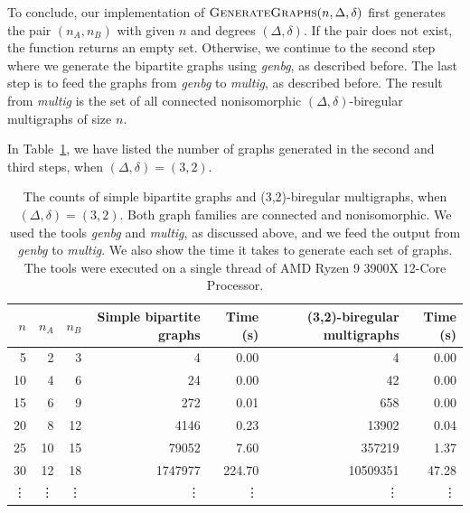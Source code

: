 To conclude, our implementation of $\textsc{GenerateGraphs}(n, \Delta, \delta)$ first generates the pair $(n_A, n_B)$ with given $n$ and degrees $(\Delta, \delta)$.
If the pair does not exist, the function returns an empty set.
Otherwise, we continue to the second step where we generate the bipartite graphs using \emph{genbg}, as described before.
The last step is to feed the graphs from \emph{genbg} to \emph{multig}, as described before.
The result from \emph{multig} is the set of all connected nonisomorphic $(\Delta, \delta)$-biregular multigraphs of size $n$.

In Table~\ref{tbl:graph_count_nonisomorphicasdasd}, we have listed the number of graphs generated in the second and third steps, when $(\Delta, \delta)=(3,2)$.


\begin{table}[H]
  \centering
  \begin{adjustbox}{width={\textwidth},keepaspectratio}%
  \begin{tabular}{r|rr|rr|rr}
    \toprule
    $n$& $n_A$ & $n_B$ & Simple bipartite graphs & Time (s) & (3,2)-biregular multigraphs  & Time (s)\\
    \midrule
    5   & 2 & 3   & 4  & 0.00    & 4     & 0.00\\
    10  & 4 & 6   & 24  & 0.00   & 42    & 0.00\\
    15  & 6 & 9   & 272  & 0.01  & 658   & 0.00\\
    20  & 8 & 12  & 4146 & 0.23  & 13902 & 0.04\\
    25  & 10 & 15 & 79052 & 7.60 & 357219& 1.37\\
    30  & 12 & 18 & 1747977 & 224.70 & 10509351& 47.28\\
    \vdots & \vdots &\vdots&\vdots&\vdots&\vdots&\vdots\\
    \bottomrule
  \end{tabular}
  \end{adjustbox}
  \caption{%
    The counts of simple bipartite graphs and (3,2)-biregular multigraphs, when $(\Delta, \delta) = (3, 2)$.
    Both graph families are connected and nonisomorphic.
    We used the tools \emph{genbg} and \emph{multig}, as discussed above, and we feed the output from \emph{genbg} to \emph{multig}.
    We also show the time it takes to generate each set of graphs.
    The tools were executed on a single thread of AMD Ryzen 9 3900X 12-Core Processor.
  }
  \label{tbl:graph_count_nonisomorphicasdasd}
\end{table}

